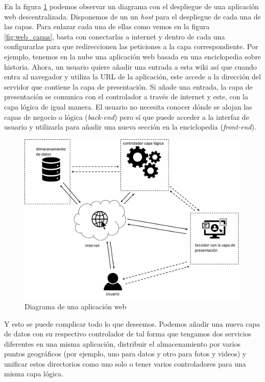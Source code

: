 \documentclass[../main.tex]{subfiles}
\begin{document}
    En la figura \ref{fig:web_despliegue} podemos observar un diagrama con el despliegue de una aplicación web descentralizada. Disponemos de un un \textit{host} para el despliegue de cada una de las capas. Para enlazar cada una de ellas como vemos en la figura \ref{fig:web_capas}, basta con conectarlas a internet y dentro de cada una configurarlas para que redireccionen las peticiones a la capa correspondiente. Por ejemplo, tenemos en la nube una aplicación web basada en una enciclopedia sobre historia. Ahora, un usuario quiere añadir una entrada a esta wiki así que cuando entra al navegador y utiliza la URL de la aplicación, este accede a la dirección del servidor que contiene la capa de presentación. Si añade una entrada, la capa de presentación se comunica con el controlador a través de internet y este, con la capa lógica de igual manera. El usuario no necesita conocer dónde se alojan las capas de negocio o lógica (\textit{back-end}) pero sí que puede acceder a la interfaz de usuario y utilizarla para añadir una nueva sección en la enciclopedia (\textit{front-end}).\\
 
    \begin{figure}[!h]
          \centering
          \includegraphics[width=\textwidth]{images/despliegue_web.png}
          \caption{Diagrama de una aplicación web}
          \label{fig:web_despliegue}
      \end{figure}
    
    Y esto se puede complicar todo lo que deseemos. Podemos añadir una nueva capa de datos con su respectivo controlador de tal forma que tengamos dos servicios diferentes en una misma aplicación, distribuir el almacenamiento por varios puntos geográficos (por ejemplo, uno para datos y otro para fotos y videos) y unificar estos directorios como uno solo o tener varios controladores para una misma capa lógica.\\
    
\end{document}
